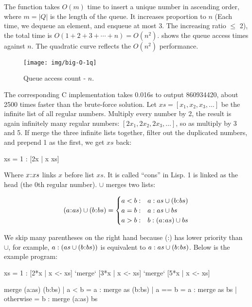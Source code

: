 \documentclass[b5paper]{article}
\begin{document}
The  function takes $O(m)$ time to insert a unique number in ascending order, where $m = |Q|$ is the length of the queue. It increases proportion to $n$ (Each time, we dequeue an element, and enqueue at most 3. The increasing ratio $\leq$ 2), the total time is $O(1 + 2 + 3 + \dotsb + n) = O(n^2)$.  shows the queue access times against $n$. The quadratic curve reflects the $O(n^2)$ performance.

\begin{figure}[htbp]
  \centering
  \texttt{[image: img/big-O-1q]}
  \caption{Queue access count - $n$.}
  \label{fig:big-O-1q}
\end{figure}

The corresponding C implementation takes 0.016s to output 860934420, about 2500 times faster than the brute-force solution. Let $xs = [x_1, x_2, x_3, \dotsc]$ be the infinite list of all regular numbers. Multiply every number by 2, the result is again infinitely many regular numbers: $[2x_1, 2x_2, 2x_3, \dotsc]$, so as multiply by 3 and 5. If merge the three infinite lists together, filter out the duplicated numbers, and prepend 1 as the first, we get $xs$ back:

\be
  xs = 1 : [2x | x \gets xs] \cup [3x | x \gets xs] \cup [5x | x \gets xs]
\ee

Where $x \mathbin{\!:\!} xs$ links $x$ before list $xs$. It is called \enquote{cons} in Lisp. 1 is linked as the head (the 0th regular number). $\cup$ merges two lists:

\[
(a \cons as) \cup (b \cons bs) = \begin{cases}
  a < b: & a : as \cup (b \cons bs) \\
  a = b: & a : as \cup bs \\
  a > b: & b : (a \cons as) \cup bs
\end{cases}
\]

We skip many parentheses on the right hand because (:) has lower priority than $\cup$, for example, $a : (as \cup (b \mathbin{\!:\!} bs))$ is equivalent to $a : as \cup (b \mathbin{\!:\!} bs)$. Below is the example program:

\begin{Haskell}
xs = 1 : [2*x | x <- xs] `merge` [3*x | x <- xs] `merge` [5*x | x <- xs]

merge (a:as) (b:bs) | a < b     = a : merge as (b:bs)
                    | a == b    = a : merge as bs
                    | otherwise = b : merge (a:as) bs
\end{Haskell}
\end{document}
